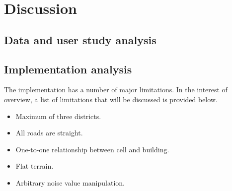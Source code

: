 \section{Discussion}
	\subsection{Data and user study analysis}
	
	\subsection{Implementation analysis}
	The implementation has a number of major limitations. In the interest of overview, a list of limitations that will be discussed is provided below.
	
	\begin{itemize}
		\item Maximum of three districts.
		\item All roads are straight.
		\item One-to-one relationship between cell and building.
		\item Flat terrain.
		\item Arbitrary noise value manipulation.
	\end{itemize}
	
